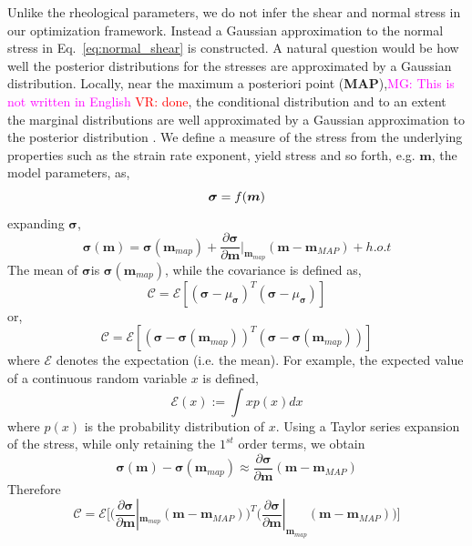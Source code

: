 \documentclass[12pt]{article}
\newcommand{\mgnote}[1]{\textcolor{magenta}{MG: #1}}
\newcommand{\vrnote}[1]{\textcolor{red}{VR: #1}}
\newcommand{\mm}{{\ensuremath{\boldsymbol{m}}}}
\newcommand{\ssigma}{{\ensuremath{\boldsymbol{\sigma}}}}
\begin{document}
Unlike the rheological parameters, we do not infer the shear and normal stress in our optimization framework. Instead a Gaussian approximation to the normal stress in Eq.~\eqref{eq:normal_shear} is constructed. A natural question would be how well the posterior distributions for the stresses are approximated by a Gaussian distribution. Locally, near the maximum a posteriori point (\textbf{MAP}),\mgnote{This is not written in English} \vrnote{done}, the conditional distribution and to an extent the marginal distributions are well approximated by a Gaussian approximation to the posterior distribution \citep{ratnaswamy2015adjoint}.  We define a measure of the stress from the underlying properties such as the strain rate exponent, yield stress and so forth, e.g. $\mm$, the model parameters, as, 
\begin{equation}
\textit \ssigma = f(\mm)
\end{equation}
expanding $\ssigma$,
\begin{equation}
\ssigma (\mm) = \ssigma(\mm_{map}) + \frac{\partial\ssigma}{\partial \mm}|_{\mm_{map}} (\mm-\mm_{MAP}) + h.o.t
\end{equation}
The mean of \ssigma is $\ssigma(\mm_{map})$, while the covariance is defined as,
\begin{equation}
\mathcal C = \mathcal E[(\ssigma-\mu_{\ssigma})^T(\ssigma-\mu_{\ssigma})]
\end{equation}
or, 
\begin{equation}
\mathcal C = \mathcal E[(\ssigma-\ssigma(\mm_{map}))^T(\ssigma-\ssigma(\mm_{map}))]
\end{equation}
where $\mathcal E$ denotes the expectation (i.e. the mean). For example, the expected value of a continuous random variable $x$ is defined,
\begin{equation}
\mathcal E(x):= \int x p(x) dx
\end{equation}
where $p(x)$ is the probability distribution of $x$.
Using a Taylor series expansion of the  stress, while only retaining the $1^{st}$ order terms, we obtain
\begin{equation}
\ssigma (\mm) -\ssigma(\mm_{map}) \approx \frac{\partial\ssigma}{\partial \mm} (\mm-\mm_{MAP})
\end{equation}
Therefore
\begin{equation}
\mathcal C = \mathcal E\big[\big(\frac{\partial\ssigma}{\partial \mm}|_{\mm_{map}} (\mm-\mm_{MAP})\big)^T\big(\frac{\partial\ssigma}{\partial \mm}|_{\mm_{map}} (\mm-\mm_{MAP})\big)\big]
\end{equation}
\end{document}
